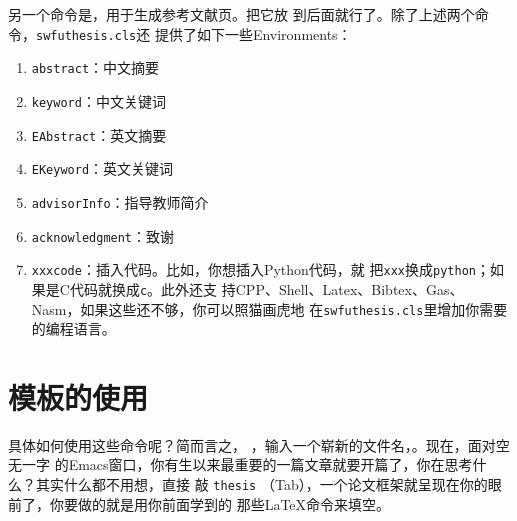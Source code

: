 \begin{latexcode}
\end{latexcode}

另一个命令是\ltx{\makebib}，用于生成参考文献页。把它放
到\ltx{\appendix}后面就行了。除了上述两个命令，\texttt{swfuthesis.cls}还
提供了如下一些Environments：

\begin{multicols}{2}
  \begin{enumerate}
  \item \verb'abstract'：中文摘要
  \item \verb'keyword'：中文关键词
  \item \verb'EAbstract'：英文摘要
  \item \verb'EKeyword'：英文关键词
  \item \verb'advisorInfo'：指导教师简介
  \item \verb'acknowledgment'：致谢
  \item \verb'xxxcode'：插入代码。比如，你想插入Python代码，就
    把\texttt{xxx}换成\texttt{python}；如果是C代码就换成\texttt{c}。此外还支
    持CPP、Shell、Latex、Bibtex、Gas、Nasm，如果这些还不够，你可以照猫画虎地
    在\texttt{swfuthesis.cls}里增加你需要的编程语言。
  \end{enumerate}
\end{multicols}

\section{模板的使用}

具体如何使用这些命令呢？简而言之， ，输入一个崭新的文件名，。现在，面对空无一字
的Emacs窗口，你有生以来最重要的一篇文章就要开篇了，你在思考什么？其实什么都不用想，直接
敲 \texttt{thesis} \LKeyTab{}（Tab），一个论文框架就呈现在你的眼前了，你要做的就是用你前面学到的
那些\LaTeX{}命令来填空。

